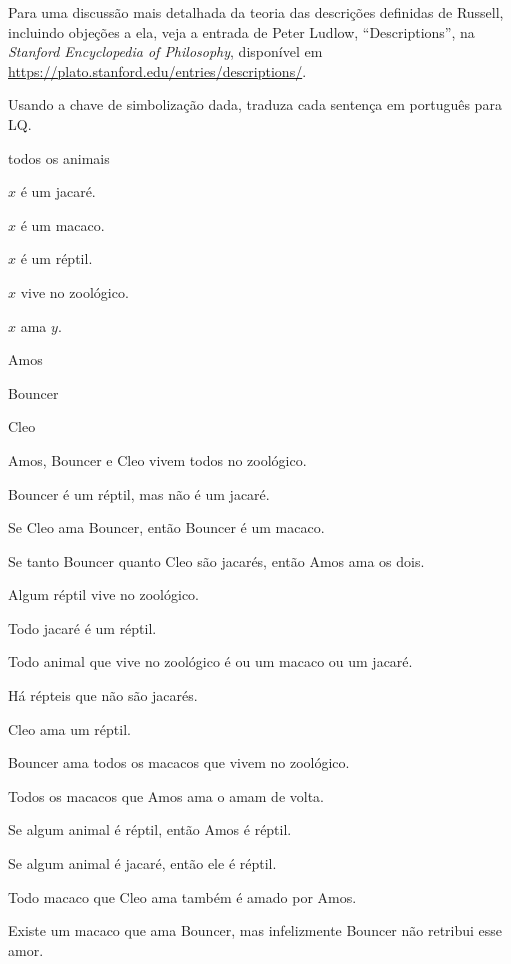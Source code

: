 Para uma discussão mais detalhada da teoria das descrições definidas de Russell, incluindo objeções a ela, veja a entrada de Peter Ludlow, ``Descriptions'', na \emph{Stanford Encyclopedia of Philosophy}, disponível em \url{https://plato.stanford.edu/entries/descriptions/}.



\practiceproblems

\solutions
\problempart
\label{pr.QLalligators}
Usando a chave de simbolização dada, traduza cada sentença em português para LQ.
\begin{ekey}
\item[UD:] todos os animais
\item[Ax:] $x$ é um jacaré.
\item[Mx:] $x$ é um macaco.
\item[Rx:] $x$ é um réptil.
\item[Zx:] $x$ vive no zoológico.
\item[Lxy:] $x$ ama $y$.
\item[a:] Amos
\item[b:] Bouncer
\item[c:] Cleo
\end{ekey}
\begin{earg}
\item Amos, Bouncer e Cleo vivem todos no zoológico. 
\item Bouncer é um réptil, mas não é um jacaré. 
\item Se Cleo ama Bouncer, então Bouncer é um macaco. 
\item Se tanto Bouncer quanto Cleo são jacarés, então Amos ama os dois.
\item Algum réptil vive no zoológico. 
\item Todo jacaré é um réptil. 
\item Todo animal que vive no zoológico é ou um macaco ou um jacaré. 
\item Há répteis que não são jacarés.
\item Cleo ama um réptil.
\item Bouncer ama todos os macacos que vivem no zoológico.
\item Todos os macacos que Amos ama o amam de volta.
\item Se algum animal é réptil, então Amos é réptil.
\item Se algum animal é jacaré, então ele é réptil.
\item Todo macaco que Cleo ama também é amado por Amos.
\item Existe um macaco que ama Bouncer, mas infelizmente Bouncer não retribui esse amor.
\end{earg}



